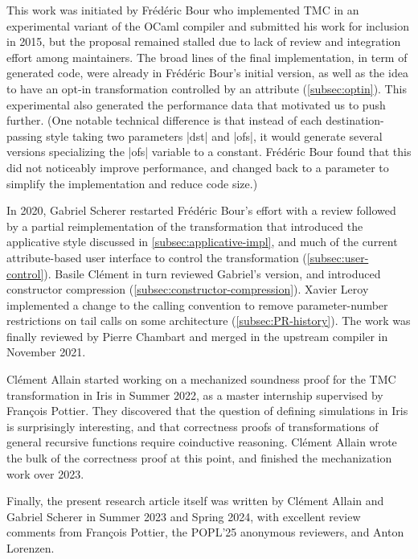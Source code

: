 \begin{acks}
  This work was initiated by Frédéric Bour who implemented TMC in an
  experimental variant of the OCaml compiler and submitted his work
  for inclusion in 2015, but the proposal remained stalled due to lack
  of review and integration effort among maintainers. The broad lines
  of the final implementation, in term of generated code, were already
  in Frédéric Bour's initial version, as well as the idea to have an
  opt-in transformation controlled by an attribute
  (\cref{subsec:optin}). This experimental also generated the
  performance data that motivated us to push further. (One notable
  technical difference is that instead of each destination-passing
  style taking two parameters \ocaml|dst| and |ofs|, it would generate
  several versions specializing the \ocaml|ofs| variable to
  a constant. Frédéric Bour found that this did not noticeably improve
  performance, and changed back to a parameter to simplify the
  implementation and reduce code size.)
  
  In 2020, Gabriel Scherer restarted Frédéric Bour's effort with
  a review followed by a partial reimplementation of the
  transformation that introduced the applicative style discussed in
  \cref{subsec:applicative-impl}, and much of the current
  attribute-based user interface to control the transformation
  (\cref{subsec:user-control}). Basile Clément in turn reviewed
  Gabriel's version, and introduced constructor compression
  (\cref{subsec:constructor-compression}). Xavier Leroy implemented
  a change to the \OCaml calling convention to remove parameter-number
  restrictions on tail calls on some architecture
  (\cref{subsec:PR-history}). The work was finally reviewed by Pierre
  Chambart and merged in the upstream \OCaml compiler in November
  2021.

  Clément Allain started working on a mechanized soundness proof for
  the TMC transformation in Iris in Summer 2022, as a master
  internship supervised by François Pottier. They discovered that the
  question of defining simulations in Iris is surprisingly
  interesting, and that correctness proofs of transformations of
  general recursive functions require coinductive reasoning. Clément
  Allain wrote the bulk of the correctness proof at this point, and
  finished the mechanization work over 2023.

  Finally, the present research article itself was written by Clément
  Allain and Gabriel Scherer in Summer 2023 and Spring 2024, with
  excellent review comments from François Pottier, the POPL'25
  anonymous reviewers, and Anton Lorenzen.
\end{acks}

